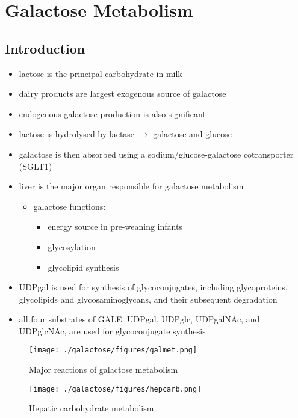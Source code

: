 \documentclass{scrartcl}
\begin{document}
\section{Galactose Metabolism}
\label{sec:orgc29830c}
\subsection{Introduction}
\label{sec:orgb5fcd8b}
\begin{itemize}
\item lactose is the principal carbohydrate in milk
\item dairy products are largest exogenous source of galactose
\item endogenous galactose production is also significant
\item lactose is hydrolysed by lactase \(\to\) galactose and glucose
\item galactose is then absorbed using a sodium/glucose-galactose cotransporter (SGLT1)
\item liver is the major organ responsible for galactose metabolism
\begin{itemize}
\item galactose functions:
\begin{itemize}
\item energy source in pre-weaning infants
\item glycosylation
\item glycolipid synthesis
\end{itemize}
\end{itemize}

\item UDPgal is used for synthesis of glycoconjugates, including
glycoproteins, glycolipids and glycosaminoglycans, and their
subsequent degradation
\item all four substrates of GALE: UDPgal, UDPglc, UDPgalNAc, and
UDPglcNAc, are used for glycoconjugate synthesis
\end{itemize}


\begin{figure}[htbp]
\centering
\texttt{[image: ./galactose/figures/galmet.png]}
\caption{\label{fig:org01d68ad}
Major reactions of galactose metabolism}
\end{figure}


\begin{figure}[htbp]
\centering
\texttt{[image: ./galactose/figures/hepcarb.png]}
\caption{\label{fig:org551bd9c}
Hepatic carbohydrate metabolism}
\end{figure}
\end{document}
